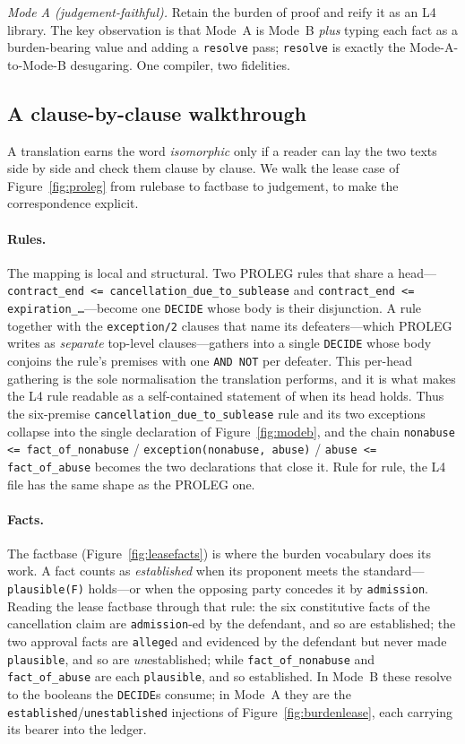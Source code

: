 \documentclass[sigconf,nonacm]{acmart}
\newcommand{\code}[1]{\texttt{\small #1}}
\begin{document}
\emph{Mode A (judgement-faithful).} Retain the burden of proof and reify it
as an L4 library. The key observation is that Mode~A is Mode~B \emph{plus}
typing each fact as a burden-bearing value and adding a \code{resolve} pass;
\code{resolve} is exactly the Mode-A-to-Mode-B desugaring. One compiler, two
fidelities.

\subsection{A clause-by-clause walkthrough}\label{app:walkthrough}
A translation earns the word \emph{isomorphic} only if a reader can lay the
two texts side by side and check them clause by clause. We walk the lease
case of Figure~\ref{fig:proleg} from rulebase to factbase to judgement, to
make the correspondence explicit.

\paragraph{Rules.} The mapping is local and structural. Two PROLEG rules that
share a head---\code{contract\_end <= cancellation\_due\_to\_sublease} and
\code{contract\_end <= expiration\_\ldots}---become one \code{DECIDE} whose
body is their disjunction. A rule together with the \code{exception/2} clauses
that name its defeaters---which PROLEG writes as \emph{separate} top-level
clauses---gathers into a single \code{DECIDE} whose body conjoins the rule's
premises with one \code{AND NOT} per defeater. This per-head gathering is the
sole normalisation the translation performs, and it is what makes the L4 rule
readable as a self-contained statement of when its head holds. Thus the
six-premise \code{cancellation\_due\_to\_sublease} rule and its two exceptions
collapse into the single declaration of Figure~\ref{fig:modeb}, and the chain
\code{nonabuse <= fact\_of\_nonabuse} / \code{exception(nonabuse, abuse)} /
\code{abuse <= fact\_of\_abuse} becomes the two declarations that close it.
Rule for rule, the L4 file has the same shape as the PROLEG one.

\paragraph{Facts.} The factbase (Figure~\ref{fig:leasefacts}) is where the
burden vocabulary does its work. A fact counts as \emph{established} when its
proponent meets the standard---\code{plausible(F)} holds---or when the
opposing party concedes it by \code{admission}. Reading the lease factbase
through that rule: the six constitutive facts of the cancellation claim are
\code{admission}-ed by the defendant, and so are established; the two approval
facts are \code{allege}d and evidenced by the defendant but never made
\code{plausible}, and so are \emph{un}established; while
\code{fact\_of\_nonabuse} and \code{fact\_of\_abuse} are each \code{plausible},
and so established. In Mode~B these resolve to the booleans the \code{DECIDE}s
consume; in Mode~A they are the \code{established}/\code{unestablished}
injections of Figure~\ref{fig:burdenlease}, each carrying its bearer into the
ledger.
\end{document}
